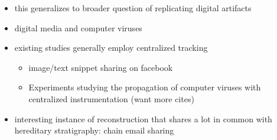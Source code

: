 \begin{itemize}
  \item this generalizes to broader question of replicating digital artifacts
  \item digital media and computer viruses
  \item existing studies generally employ centralized tracking
  \begin{itemize}
    \item image/text snippet sharing on facebook \citep{friggeri2014rumor}
    \item Experiments studying the propagation of computer viruses with centralized instrumentation \citep{cohen1987computer} (want more cites)
  \end{itemize}
  \item interesting instance of reconstruction that shares a lot in common with hereditary stratigraphy: chain email sharing \citep{libennowell2008tracing}
\end{itemize}

